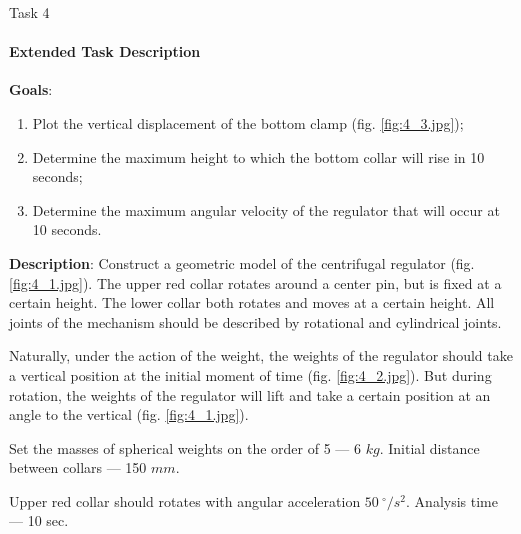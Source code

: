 \documentclass[aspectratio=169]{beamer}
\begin{document}
\begin{frame}[t]{Task 4}
    \framesubtitle{Extended Task Description}
    \footnotesize
    \vspace{-0.3cm}

    \textbf{Goals}:
    \begin{enumerate}
        \footnotesize
        \item Plot the vertical displacement of the bottom clamp (fig. \ref{fig:4_3.jpg});
        \item Determine the maximum height to which the bottom collar will rise in 10 seconds;
        \item Determine the maximum angular velocity of the regulator that will occur at 10 seconds.
    \end{enumerate}
    \smallskip

    \textbf{Description}: Construct a geometric model of the centrifugal regulator (fig. \ref{fig:4_1.jpg}). The upper red collar rotates around a center pin, but is fixed at a certain height. The lower collar both rotates and moves at a certain height. All joints of the mechanism should be described by rotational and cylindrical joints.
    \smallskip

    Naturally, under the action of the weight, the weights of the regulator should take a vertical position at the initial moment of time (fig. \ref{fig:4_2.jpg}). But during rotation, the weights of the regulator will lift and take a certain position at an angle to the vertical (fig. \ref{fig:4_1.jpg}).
    
    Set the masses of spherical weights on the order of 5 --- 6 $kg$. Initial distance between collars --- 150 $mm$.

    Upper red collar should rotates with angular acceleration $50\ ^\circ /s^2$. Analysis time --- 10 sec.
\end{frame}
\end{document}
